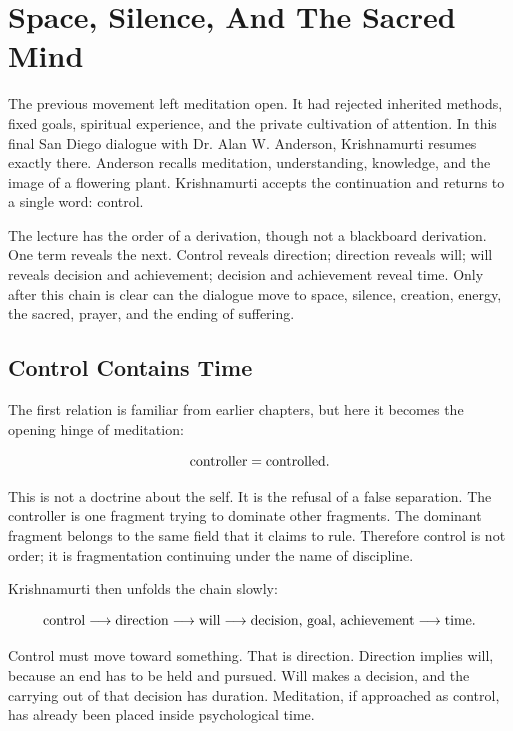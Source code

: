 \documentclass[11pt,oneside]{book}
\begin{document}
\chapter{Space, Silence, And The Sacred Mind}

The previous movement left meditation open. It had rejected inherited methods, fixed goals, spiritual experience, and the private cultivation of attention. In this final San Diego dialogue with Dr. Alan W. Anderson, Krishnamurti resumes exactly there. Anderson recalls meditation, understanding, knowledge, and the image of a flowering plant. Krishnamurti accepts the continuation and returns to a single word: control.

The lecture has the order of a derivation, though not a blackboard derivation. One term reveals the next. Control reveals direction; direction reveals will; will reveals decision and achievement; decision and achievement reveal time. Only after this chain is clear can the dialogue move to space, silence, creation, energy, the sacred, prayer, and the ending of suffering.

\section{Control Contains Time}

The first relation is familiar from earlier chapters, but here it becomes the opening hinge of meditation:

\begin{equation}
\hbox{controller}=\hbox{controlled}.
\end{equation}

This is not a doctrine about the self. It is the refusal of a false separation. The controller is one fragment trying to dominate other fragments. The dominant fragment belongs to the same field that it claims to rule. Therefore control is not order; it is fragmentation continuing under the name of discipline.

Krishnamurti then unfolds the chain slowly:

\begin{equation}
\hbox{control}
\longrightarrow
\hbox{direction}
\longrightarrow
\hbox{will}
\longrightarrow
\hbox{decision, goal, achievement}
\longrightarrow
\hbox{time}.
\end{equation}

Control must move toward something. That is direction. Direction implies will, because an end has to be held and pursued. Will makes a decision, and the carrying out of that decision has duration. Meditation, if approached as control, has already been placed inside psychological time.
\end{document}
